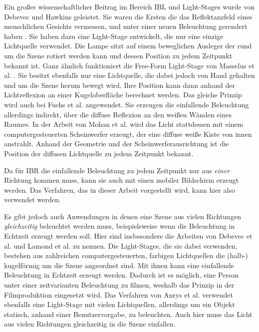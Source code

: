   Ein großer wissenschaftlicher Beitrag im Bereich IBL und Light-Stages wurde von Debevec und Hawkins geleistet.
  Sie waren die Ersten die das Reflektanzfeld eines menschlichen Gesichts vermessen, und unter einer neuen Beleuchtung gerendert haben \cite{Debevec_2000}. 
  Sie haben dazu eine Light-Stage entwickelt, die nur eine einzige Lichtquelle verwendet.
  Die Lampe sitzt auf einem beweglichen Ausleger der rund um die Szene rotiert werden kann und dessen Position zu jedem Zeitpunkt bekannt ist.
  Ganz ähnlich funktioniert die Free-Form Light-Stage von Masselus et al. \cite{Masselus_2002}. Sie besitzt ebenfalls nur eine Lichtquelle, die dabei jedoch von Hand gehalten und um die Szene herum bewegt wird. 
  Ihre Position kann dann  anhand der Lichtreflexion an einer Kugeloberfläche berechnet werden.
  Das gleiche Prinzip wird auch bei Fuchs et al. \cite{Fuchs_2005} angewendet. Sie erzeugen die einfallende Beleuchtung allerdings indirekt, über die diffuse Reflexion an den weißen Wänden eines Raumes.
  In der Arbeit von Mohan et al. \cite{Mohan_2005} wird das Licht stattdessen mit einem computergesteuerten Scheinwerfer erzeugt, der eine diffuse weiße Kiste von innen anstrahlt. 
  Anhand der Geometrie und der Scheinwerferausrichtung ist die Position der diffusen Lichtquelle zu jedem Zeitpunkt bekannt.

  Da für IBR die einfallende Beleuchtung zu jedem Zeitpunkt nur aus \emph{einer} Richtung kommen muss, kann sie auch mit einen mobiler Bildschirm erzeugt werden. 
  Das Verfahren, das in dieser Arbeit vorgestellt wird, kann hier also  verwendet werden.
 
  Es gibt jedoch auch Anwendungen in denen eine Szene aus vielen Richtungen \emph{gleichzeitig} beleuchtet werden muss, beispielsweise wenn die  Beleuchtung in Echtzeit erzeugt werden soll.
  Hier sind insbesondere die Arbeiten von Debevec et al. \cite{Debevec_2002} und Lamond et al. \cite{Lamond_2006} zu nennen. 
  Die Light-Stages, die sie dabei verwenden, bestehen aus zahlreichen computergesteuerten, farbigen Lichtquellen die (halb-) kugelförmig um die Szene angeordnet sind.
  Mit ihnen kann eine einfallende Beleuchtung in Echtzeit erzeugt werden. 
  Dadurch ist es möglich, eine Person unter einer zeitvarianten Beleuchtung zu filmen, weshalb das Prinzip in der Filmproduktion eingesetzt wird.
  Das Verfahren von Anrys et al. \cite{Anrys_2004} verwendet ebenfalls eine Light-Stage mit vielen Lichtquellen, allerdings um ein Objekt statisch, anhand einer Benutzervorgabe, zu beleuchten.
  Auch hier muss das Licht aus vielen Richtungen gleichzeitig in die Szene einfallen.
 
